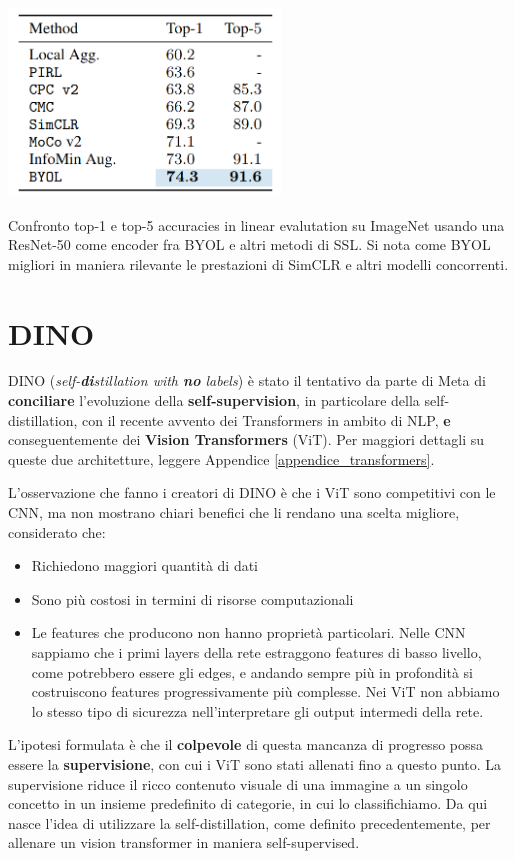 \begin{table}[t]
    \centering
    \includegraphics[height=50mm]{Immagini/ssl/res_byol.png}
    \caption{Confronto top-1 e top-5 accuracies in linear evalutation su ImageNet usando una ResNet-50 come encoder fra BYOL e altri metodi di SSL. Si nota come BYOL migliori in maniera rilevante le prestazioni di SimCLR e altri modelli concorrenti.}
    \label{tab:res-byol}
\end{table}


\section{DINO}
DINO (\textit{self-\textbf{di}stillation with \textbf{no} labels}) \cite{dino} è stato il tentativo da parte di Meta di \textbf{conciliare} l'evoluzione della \textbf{self-supervision}, in particolare della self-distillation, con il recente avvento dei Transformers \cite{transformer} in ambito di NLP, \textbf{e} conseguentemente dei \textbf{Vision Transformers} (ViT). Per maggiori dettagli su queste due architetture, leggere Appendice \ref{appendice_transformers}.

L'osservazione che fanno i creatori di DINO è che i ViT sono competitivi con le CNN, ma non mostrano chiari benefici che li rendano una scelta migliore, considerato che:
\begin{itemize}
    \item Richiedono maggiori quantità di dati
    \item Sono più costosi in termini di risorse computazionali
    \item Le features che producono non hanno proprietà particolari. Nelle CNN sappiamo che i primi layers della rete estraggono features di basso livello, come potrebbero essere gli edges, e andando sempre più in profondità si costruiscono features progressivamente più complesse. Nei ViT non abbiamo lo stesso tipo di sicurezza nell'interpretare gli output intermedi della rete.
\end{itemize}
L'ipotesi formulata è che il \textbf{colpevole} di questa mancanza di progresso possa essere la \textbf{supervisione}, con cui i ViT sono stati allenati fino a questo punto. La supervisione riduce il ricco contenuto visuale di una immagine a un singolo concetto in un insieme predefinito di categorie, in cui lo classifichiamo. Da qui nasce l'idea di utilizzare la self-distillation, come definito precedentemente, per allenare un vision transformer in maniera self-supervised.

